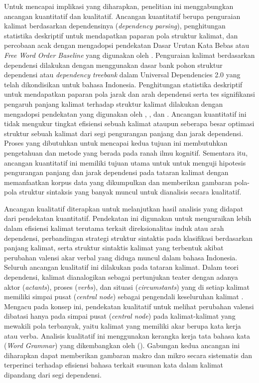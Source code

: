 Untuk mencapai implikasi yang diharapkan, penelitian ini menggabungkan ancangan kuantitatif dan kualitatif. Ancangan kuantitatif berupa penguraian kalimat berdasarkan dependensinya (\textit{dependency parsing}), penghitungan statistika deskriptif untuk mendapatkan paparan pola struktur kalimat, dan percobaan acak dengan mengadopsi pendekatan Dasar Urutan Kata Bebas atau \textit{Free Word Order Baseline} yang digunakan oleh \cite{futrell2015large}. Penguraian kalimat berdasarkan dependensi dilakukan dengan menggunakan dasar bank pohon struktur dependensi atau \textit{dependency treebank} dalam Universal Dependencies 2.0 \citep{nivre2017universal} yang telah dikondisikan untuk bahasa Indonesia. Penghitungan statistika deskriptif untuk mendapatkan paparan pola jarak dan arah dependensi serta tes signifikansi pengaruh panjang kalimat terhadap struktur kalimat dilakukan dengan mengadopsi pendekatan yang digunakan oleh \cite{gildea2010grammars}, \cite{futrell2015large}, \cite{jiang2015effects} dan \cite{liu2017dependency}. Ancangan kuantitatif ini tidak mengukur tingkat efisiensi sebuah kalimat ataupun seberapa besar optimasi struktur sebuah kalimat dari segi pengurangan panjang dan jarak dependensi. Proses yang dibutuhkan untuk mencapai kedua tujuan ini membutuhkan pengetahuan dan metode yang berada pada ranah ilmu kognitif. Sementara itu, ancangan kuantitatif ini memiliki tujuan utama untuk untuk menguji hipotesis pengurangan panjang dan jarak dependensi pada tataran kalimat dengan memanfaatkan korpus data yang dikumpulkan dan memberikan gambaran pola-pola struktur sintaksis yang banyak muncul untuk dianalisis secara kualitatif.

Ancangan kualitatif diterapkan untuk melanjutkan hasil analisis yang didapat dari pendekatan kuantitatif. Pendekatan ini digunakan untuk menguraikan lebih dalam efisiensi kalimat terutama terkait direksionalitas induk atau  arah dependensi, perbandingan strategi struktur sintaktis pada klasifikasi berdasarkan panjang kalimat, serta struktur sintaktis kalimat yang terbentuk akibat perubahan valensi akar verbal yang diduga muncul dalam bahasa Indonesia. Seluruh ancangan kualitatif ini dilakukan pada tataran kalimat. Dalam teori dependensi, kalimat dianalogikan sebagai pertunjukan teater dengan adanya aktor (\textit{actants}), proses (\textit{verbs}), dan situasi (\textit{circumstants}) yang di setiap kalimat memiliki simpai pusat (\textit{central node}) sebagai pengendali keseluruhan kalimat \citep{tesniere1959elements}. Mengacu pada konsep ini, pendekatan kualitatif untuk melihat perubahan valensi dibatasi hanya pada simpai pusat (\textit{central node}) pada kalimat-kalimat yang mewakili pola terbanyak, yaitu kalimat yang memiliki akar berupa kata kerja atau verba. Analisis kualitatif ini menggunakan kerangka kerja tata bahasa kata (\textit{Word Grammar}) yang dikembangkan oleh (\citealp{hudson1984word,hudson2007language}). Gabungan kedua ancangan ini diharapkan dapat memberikan gambaran makro dan mikro secara sistematis dan terperinci terhadap efisiensi bahasa terkait susunan kata dalam kalimat dipandang dari segi dependensi. 



